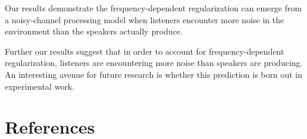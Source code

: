 \documentclass[10pt, letterpaper]{article}
\begin{document}
Our results demonstrate the frequency-dependent regularization can
emerge from a noisy-channel processing model when listeners encounter
more noise in the environment than the speakers actually produce.

Further our results suggest that in order to account for
frequency-dependent regularization, listeners are encountering more
noise than speakers are producing. An interesting avenue for future
research is whether this prediction is born out in experimental work.

\hypertarget{references}{%
\section{References}\label{references}}

\setlength{\parindent}{-0.1in} 
\setlength{\leftskip}{0.125in}

\noindent
\end{document}
